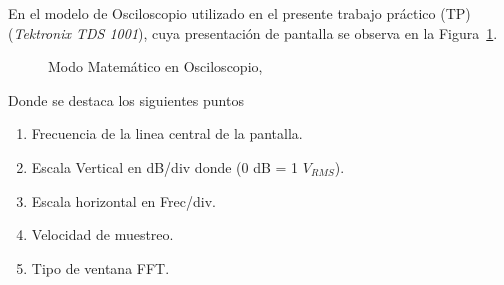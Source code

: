     En el modelo de Osciloscopio utilizado en el presente trabajo práctico (TP) 
    (\textit{Tektronix TDS 1001}), cuya presentación de pantalla se observa en la 
    Figura~\ref{fig:MathModoEnTek}.   
        \begin{figure}[H]
            \centering
            \caption{Modo Matemático en Osciloscopio,}
            \label{fig:MathModoEnTek}
        \end{figure}
    Donde se destaca los siguientes puntos 
    \begin{enumerate}
        \item Frecuencia de la linea central de la pantalla.
        \item Escala Vertical en dB/div donde (0 dB = 1 \(V_{RMS}\)).
        \item Escala horizontal en Frec/div.
        \item Velocidad de muestreo. 
        \item Tipo de ventana FFT. 
    \end{enumerate}    

